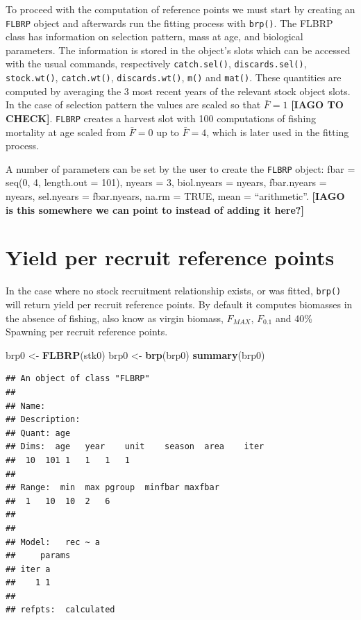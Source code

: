 \documentclass[
]{book}
\newenvironment{Shaded}{\begin{snugshade}}{\end{snugshade}}
\newcommand{\FunctionTok}[1]{\textcolor[rgb]{0.13,0.29,0.53}{\textbf{#1}}}
\newcommand{\NormalTok}[1]{#1}
\newcommand{\OtherTok}[1]{\textcolor[rgb]{0.56,0.35,0.01}{#1}}
\begin{document}
To proceed with the computation of reference points we must start by creating an \texttt{FLBRP} object and afterwards run the fitting process with \texttt{brp()}. The FLBRP class has information on selection pattern, mass at age, and biological parameters. The information is stored in the object's slots which can be accessed with the usual commands, respectively \texttt{catch.sel()}, \texttt{discards.sel()}, \texttt{stock.wt()}, \texttt{catch.wt()}, \texttt{discards.wt()}, \texttt{m()} and \texttt{mat()}. These quantities are computed by averaging the 3 most recent years of the relevant stock object slots. In the case of selection pattern the values are scaled so that \(\bar{F}=1\) \textbf{{[}IAGO TO CHECK{]}}. \texttt{FLBRP} creates a harvest slot with 100 computations of fishing mortality at age scaled from \(\bar{F}=0\) up to \(\bar{F}=4\), which is later used in the fitting process.

A number of parameters can be set by the user to create the \texttt{FLBRP} object: fbar = seq(0, 4, length.out = 101), nyears = 3, biol.nyears = nyears, fbar.nyears = nyears, sel.nyears = fbar.nyears, na.rm = TRUE, mean = ``arithmetic''. \textbf{{[}IAGO is this somewhere we can point to instead of adding it here?{]}}

\hypertarget{yield-per-recruit-reference-points}{%
\section{Yield per recruit reference points}\label{yield-per-recruit-reference-points}}

In the case where no stock recruitment relationship exists, or was fitted, \texttt{brp()} will return yield per recruit reference points. By default it computes biomasses in the absence of fishing, also know as virgin biomass, \(F_{MAX}\), \(F_{0.1}\) and 40\% Spawning per recruit reference points.

\begin{Shaded}
\begin{Highlighting}[]
\NormalTok{brp0 }\OtherTok{\textless{}{-}} \FunctionTok{FLBRP}\NormalTok{(stk0)}
\NormalTok{brp0 }\OtherTok{\textless{}{-}} \FunctionTok{brp}\NormalTok{(brp0)}
\FunctionTok{summary}\NormalTok{(brp0)}
\end{Highlighting}
\end{Shaded}

\begin{verbatim}
## An object of class "FLBRP"
## 
## Name:  
## Description:  
## Quant: age 
## Dims:  age   year    unit    season  area    iter
##  10  101 1   1   1   1   
## 
## Range:  min  max pgroup  minfbar maxfbar 
##  1   10  10  2   6   
## 
## 
## Model:   rec ~ a
##     params
## iter a
##    1 1
## 
## refpts:  calculated
\end{verbatim}
\end{document}
